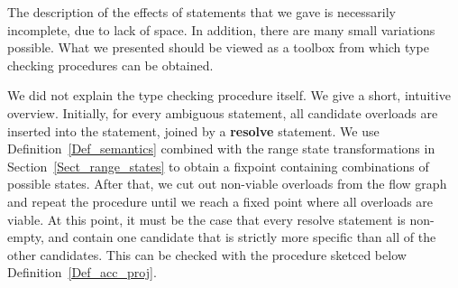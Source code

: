 The description of the effects of statements that we gave is necessarily
incomplete, due to lack of space. In addition, there are many small 
variations possible. What we presented should be viewed as a toolbox
from which type checking procedures can be obtained.

We did not explain the type checking procedure itself. 
We give a short, intuitive overview. 
Initially, for every ambiguous statement, all candidate overloads
are inserted into the statement, joined by a {\bf resolve} statement.
We use Definition~\ref{Def_semantics} combined
with the range state transformations in Section~\ref{Sect_range_states}
to obtain a fixpoint containing combinations of possible states. 
After that, we cut out non-viable overloads 
from the flow graph and repeat the procedure until we reach
a fixed point where all overloads are viable. 
At this point, it must be the case that every
resolve statement is non-empty, and contain one candidate 
that is strictly more specific than all of the other candidates.
This can be checked with the procedure sketced below 
Definition~\ref{Def_acc_proj}.

